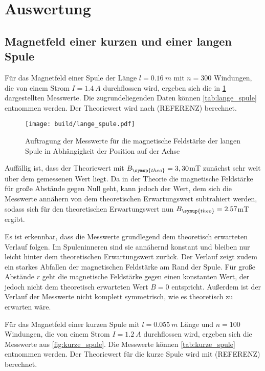 \section{Auswertung}
\label{sec:Auswertung}

\subsection{Magnetfeld einer kurzen und einer langen Spule}

Für das Magnetfeld einer Spule der Länge $l=\SI{0,16}{m}$ mit $n=300$ Windungen,
die von einem Strom $I=\SI{1,4}{A}$ durchflossen wird, ergeben sich die in
\ref{fig:lange_spule} dargestellten Messwerte. Die zugrundeliegenden Daten können
\ref{tab:lange_spule} entnommen werden. Der Theoriewert wird nach (REFERENZ) berechnet.

\begin{figure}
  \centering
  \texttt{[image: build/lange\_spule.pdf]}
  \caption{Auftragung der Messwerte für die magnetische Feldstärke der langen Spule
  in Abhängigkeit der Position auf der Achse}
  \label{fig:lange_spule}
\end{figure}

Auffällig ist, dass der Theoriewert mit $B_{\symup{theo}}=3,30$mT zunächst sehr weit über dem
gemessenen Wert liegt. Da in der Theorie die magnetische Feldstärke für große Abstände
gegen Null geht, kann jedoch der Wert, dem sich die Messwerte annähern von dem theoretischen
Erwartungswert subtrahiert werden, sodass sich für den theoretischen Erwartungswert
nun $B_{\symup{theo}}=2.57$mT ergibt.

Es ist erkennbar, dass die Messwerte grundlegend dem theoretisch erwarteten Verlauf folgen.
Im Spuleninneren sind sie annähernd konstant und bleiben nur leicht hinter dem
theoretischen Erwartungswert zurück. Der Verlauf zeigt zudem ein starkes Abfallen
der magnetischen Feldstärke am Rand der Spule. Für große Abstände $r$ geht die magnetische
Feldstärke gegen einen konstanten Wert, der jedoch nicht dem theoretisch erwarteten
Wert $B=0$ entspricht. Außerdem ist der Verlauf der Messwerte nicht komplett symmetrisch,
wie es theoretisch zu erwarten wäre.


Für das Magnetfeld einer kurzen Spule mit $l=\SI{0,055}{m}$ Länge und $n=100$ Windungen,
die von einem Strom $I=\SI{1,2}{A}$ durchflossen wird, ergeben sich die Messwerte aus
\ref{fig:kurze_spule}. Die Messwerte können \ref{tab:kurze_spule} entnommen werden.
Der Theoriewert für die kurze Spule wird mit (REFERENZ) berechnet.

